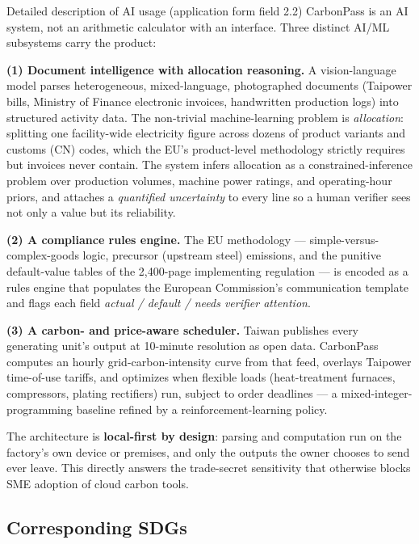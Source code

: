 \begin{formfield}{Detailed description of AI usage (application form field 2.2)}
CarbonPass is an AI system, not an arithmetic calculator with an interface.
Three distinct AI/ML subsystems carry the product:

\smallskip
\textbf{(1) Document intelligence with allocation reasoning.} A
vision-language model parses heterogeneous, mixed-language, photographed
documents (Taipower bills, Ministry of Finance electronic invoices, handwritten
production logs) into structured activity data. The non-trivial machine-learning
problem is \emph{allocation}: splitting one facility-wide electricity figure
across dozens of product variants and customs (CN) codes, which the EU's
product-level methodology strictly requires but invoices never contain. The
system infers allocation as a constrained-inference problem over production
volumes, machine power ratings, and operating-hour priors, and attaches a
\emph{quantified uncertainty} to every line so a human verifier sees not only a
value but its reliability.

\smallskip
\textbf{(2) A compliance rules engine.} The EU methodology --- simple-versus-complex-goods
logic, precursor (upstream steel) emissions, and the punitive default-value
tables of the 2,400-page implementing regulation\cite{omm} --- is encoded as a
rules engine that populates the European Commission's communication template
and flags each field \emph{actual / default / needs verifier attention}.

\smallskip
\textbf{(3) A carbon- and price-aware scheduler.} Taiwan publishes every
generating unit's output at 10-minute resolution as open
data\cite{taipowerdata}. CarbonPass computes an hourly grid-carbon-intensity
curve from that feed, overlays Taipower time-of-use tariffs\cite{taipower}, and
optimizes when flexible loads (heat-treatment furnaces, compressors, plating
rectifiers) run, subject to order deadlines --- a mixed-integer-programming
baseline refined by a reinforcement-learning policy.

\smallskip
The architecture is \textbf{local-first by design}: parsing and computation run
on the factory's own device or premises, and only the outputs the owner chooses
to send ever leave. This directly answers the trade-secret sensitivity that
otherwise blocks SME adoption of cloud carbon tools.
\end{formfield}

\subsection{Corresponding SDGs}\label{sec:sdg}


